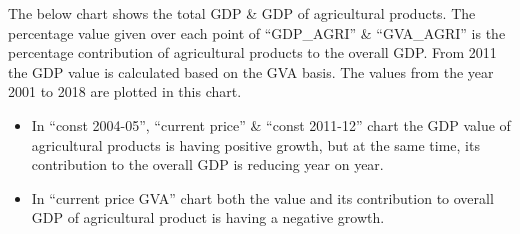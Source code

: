 \documentclass[]{article}
\providecommand{\tightlist}{%
  \setlength{\itemsep}{0pt}\setlength{\parskip}{0pt}}
\begin{document}
The below chart shows the total GDP \& GDP of agricultural products. The
percentage value given over each point of ``GDP\_AGRI'' \& ``GVA\_AGRI''
is the percentage contribution of agricultural products to the overall
GDP. From 2011 the GDP value is calculated based on the GVA basis. The
values from the year 2001 to 2018 are plotted in this chart.

\begin{itemize}
\tightlist
\item
  In ``const 2004-05'', ``current price'' \& ``const 2011-12'' chart the
  GDP value of agricultural products is having positive growth, but at
  the same time, its contribution to the overall GDP is reducing year on
  year.
\item
  In ``current price GVA'' chart both the value and its contribution to
  overall GDP of agricultural product is having a negative growth.
\end{itemize}
\end{document}
